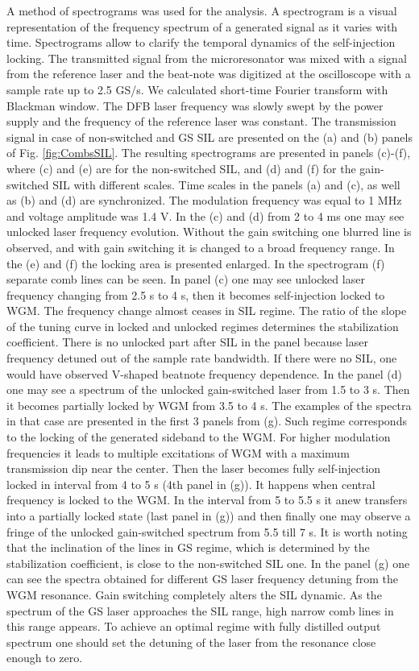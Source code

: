 \documentclass[a4paper, amsfonts, amssymb, amsmath, reprint, showkeys, nofootinbib, twoside,longbibliography, aps]{revtex4-1}
\begin{document}
A method of spectrograms was used for the analysis. A spectrogram is a visual representation of the frequency spectrum of a generated signal as it varies with time. Spectrograms allow to clarify the temporal dynamics of the self-injection locking. The transmitted signal from the microresonator was mixed with a signal from the reference laser and the beat-note was digitized at the oscilloscope with a sample rate up to 2.5 GS/s. We calculated short-time Fourier transform with Blackman window. The DFB laser frequency was slowly swept by the power supply and the frequency of the reference laser was constant. The transmission signal in case of  non-switched and GS SIL are presented on the (a) and (b) panels of Fig. \ref{fig:CombsSIL}. The resulting spectrograms are presented in panels (c)-(f), where (c) and (e) are for the non-switched SIL, and (d) and (f) for the gain-switched SIL with different scales. Time scales in the panels (a) and (c), as well as (b) and (d) are synchronized. The modulation frequency was equal to 1 MHz and voltage amplitude was 1.4 V. In the (c) and (d) from 2 to 4 ms one may see unlocked laser frequency evolution. Without the gain switching one blurred line is observed, and with gain switching it is changed to a broad frequency range. In the (e) and (f) the locking area is presented enlarged. In the spectrogram (f) separate comb lines can be seen. In panel (c) one may see unlocked laser frequency changing from 2.5 s to 4 s, then it becomes self-injection locked to WGM. The frequency change almost ceases in SIL regime. The ratio of the slope of the tuning curve in locked and unlocked regimes determines the stabilization coefficient. There is no unlocked part after SIL in the panel because laser frequency detuned out of the sample rate bandwidth. If there were no SIL, one would have observed V-shaped beatnote frequency dependence. In the panel (d) one may see a spectrum of the unlocked gain-switched laser from 1.5 to 3 s. Then it becomes partially locked by WGM from 3.5 to 4 s. The examples of the spectra in that case are presented in the first 3 panels from (g). Such regime corresponds to the locking of the generated sideband to the WGM. For higher modulation frequencies it leads to multiple excitations of WGM with a maximum transmission dip near the center. Then the laser becomes fully self-injection locked in interval from 4 to 5 s (4th panel in (g)). It happens when central frequency is locked to the WGM. In the interval from 5 to 5.5 s it anew transfers into a  partially locked state (last panel in (g)) and then finally one may observe a fringe of the unlocked gain-switched spectrum from 5.5 till 7 s. It is worth noting that the inclination of the lines in GS regime, which is determined by the stabilization coefficient, is close to the non-switched SIL one. In the panel (g) one can see the spectra obtained for different GS laser frequency detuning from the WGM resonance. Gain switching completely alters the SIL dynamic. As the spectrum of the GS laser approaches the SIL range, high narrow comb lines in this range appears. To achieve an optimal regime with fully distilled output spectrum one should set the detuning of the laser from the resonance close enough to zero.
\end{document}
